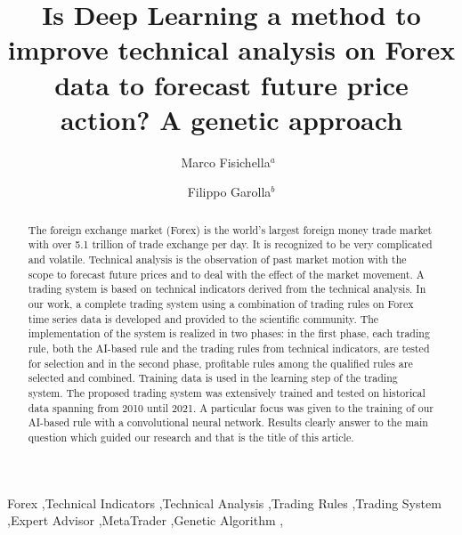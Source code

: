 \documentclass[1p]{elsarticle}
\begin{document}
\begin{frontmatter}

\title{Is Deep Learning a method to improve technical analysis on Forex data to forecast future price action? A genetic approach}

%

\author{Marco Fisichella$^{a}$~}

\author{Filippo Garolla$^{b}$}

\address{%
$^{a}$  L3S Research Center of Leibniz University of Hannover, Germany\\
$^{b}$  SLR Engineering, Graz, Austria\\
}

\begin{abstract}
The foreign exchange market (Forex) is the world’s largest foreign money trade market with over 5.1 trillion of trade exchange per day. It is recognized to be very complicated and volatile. Technical analysis is the observation of past market motion with the scope to forecast future prices and to deal with the effect of the market movement. A trading system is based on technical indicators derived from the technical analysis. In our work, a complete trading system using a combination of trading rules on Forex time series data is developed and provided to the scientific community. The implementation of the system is realized in two phases: in the first phase, each trading rule, both the AI-based rule and the trading rules from technical indicators, are tested for selection and in the second phase, profitable rules among the qualified rules are selected and combined. Training data is used in the learning step of the trading system. The proposed trading system was extensively trained and tested on historical data spanning from 2010 until 2021. A particular focus was given to the training of our AI-based rule with a convolutional neural network. Results clearly answer to the main question which guided our research and that is the title of this article.
\end{abstract}

\begin{keyword}
Forex \sep Technical Indicators \sep Technical Analysis \sep Trading Rules \sep Trading System \sep Expert Advisor \sep MetaTrader \sep Genetic Algorithm \sep 
\end{keyword}

\end{frontmatter}
\end{document}
